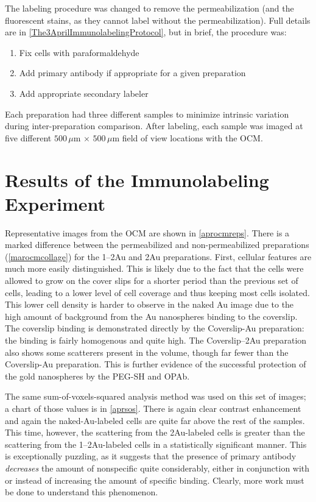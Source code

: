 The labeling procedure was changed to remove the permeabilization (and the fluorescent stains, as they cannot label without the permeabilization). Full details are in \autoref{The3AprilImmunolabelingProtocol}, but in brief, the procedure was:

\begin{enumerate}
\item Fix cells with paraformaldehyde

\item Add primary antibody if appropriate for a given preparation

\item Add appropriate secondary labeler

\end{enumerate}

Each preparation had three different samples to minimize intrinsic variation during inter-preparation comparison. After labeling, each sample was imaged at five different $500\,\mu\mathrm{m}\,\times\,500\,\mu\mathrm{m}$ field of view locations with the OCM.

\section{Results of the Immunolabeling Experiment}
\label{resultsoftheimmunolabelingexperiment}

Representative images from the OCM are shown in \autoref{aprocmreps}. There is a marked difference between the permeabilized and non-permeabilized preparations (\autoref{marocmcollage}) for the 1--2Au and 2Au preparations. First, cellular features are much more easily distinguished. This is likely due to the fact that the cells were allowed to grow on the cover slips for a shorter period than the previous set of cells, leading to a lower level of cell coverage and thus keeping most cells isolated. This lower cell density is harder to observe in the naked Au image due to the high amount of background from the Au nanospheres binding to the coverslip. The coverslip binding is demonstrated directly by the Coverslip-Au preparation: the binding is fairly homogenous and quite high. The Coverslip--2Au preparation also shows some scatterers present in the volume, though far fewer than the Coverslip-Au preparation. This is further evidence of the successful protection of the gold nanospheres by the PEG-SH and OPAb.

The same sum-of-voxels-squared analysis method was used on this set of images; a chart of those values is in \autoref{aprsos}. There is again clear contrast enhancement and again the naked-Au-labeled cells are quite far above the rest of the samples. This time, however, the scattering from the 2Au-labeled cells is greater than the scattering from the 1--2Au-labeled cells in a statistically significant manner. This is exceptionally puzzling, as it suggests that the presence of primary antibody \emph{decreases} the amount of nonspecific quite considerably, either in conjunction with or instead of increasing the amount of specific binding. Clearly, more work must be done to understand this phenomenon.

